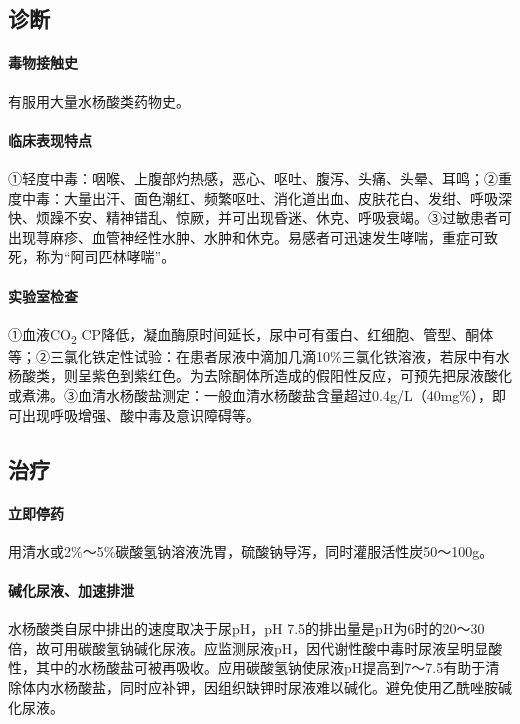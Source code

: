 \subsection{诊断}

\paragraph{毒物接触史}

有服用大量水杨酸类药物史。

\paragraph{临床表现特点}

①轻度中毒：咽喉、上腹部灼热感，恶心、呕吐、腹泻、头痛、头晕、耳鸣；②重度中毒：大量出汗、面色潮红、频繁呕吐、消化道出血、皮肤花白、发绀、呼吸深快、烦躁不安、精神错乱、惊厥，并可出现昏迷、休克、呼吸衰竭。③过敏患者可出现荨麻疹、血管神经性水肿、水肿和休克。易感者可迅速发生哮喘，重症可致死，称为“阿司匹林哮喘”。

\paragraph{实验室检查}

①血液CO\textsubscript{2}
CP降低，凝血酶原时间延长，尿中可有蛋白、红细胞、管型、酮体等；②三氯化铁定性试验：在患者尿液中滴加几滴10\%三氯化铁溶液，若尿中有水杨酸类，则呈紫色到紫红色。为去除酮体所造成的假阳性反应，可预先把尿液酸化或煮沸。③血清水杨酸盐测定：一般血清水杨酸盐含量超过0.4g/L（40mg\%），即可出现呼吸增强、酸中毒及意识障碍等。

\subsection{治疗}

\paragraph{立即停药}

用清水或2\%～5\%碳酸氢钠溶液洗胃，硫酸钠导泻，同时灌服活性炭50～100g。

\paragraph{碱化尿液、加速排泄}

水杨酸类自尿中排出的速度取决于尿pH，pH
7.5的排出量是pH为6时的20～30倍，故可用碳酸氢钠碱化尿液。应监测尿液pH，因代谢性酸中毒时尿液呈明显酸性，其中的水杨酸盐可被再吸收。应用碳酸氢钠使尿液pH提高到7～7.5有助于清除体内水杨酸盐，同时应补钾，因组织缺钾时尿液难以碱化。避免使用乙酰唑胺碱化尿液。

